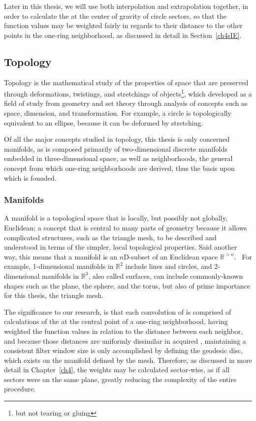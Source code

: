 Later in this thesis, we will use both interpolation and extrapolation together, in order to calculate the  at the center of gravity of circle sectors, so that the function values may be weighted fairly in regards to their distance to the other points in the one-ring neighborhood, as discussed in detail in Section~\ref{ch4sIE}.

%
%
%
%
\subsection{Topology}
\label{ch2sETBssT}
Topology is the mathematical study of the properties of space that are preserved through deformations, twistings, and stretchings of objects\footnote{but not tearing or gluing}, which developed as a field of study from geometry and set theory through analysis of concepts such as space, dimension, and transformation. For example, a circle is topologically equivalent to an ellipse, because it can be deformed by stretching.~\cite{Weisstein19c}

Of all the major concepts studied in topology, this thesis is only concerned manifolds, as \tdd{} is composed primarily of two-dimensional discrete manifolds embedded in three-dimensional space, as well as neighborhoods, the general concept from which one-ring neighborhoods are derived, thus the basis upon which  is founded.

%
%
\subsubsection{Manifolds}
\label{ch2sETBssTsssM}
A manifold is a topological space that is locally, but possibly not globally, Euclidean; a concept that is central to many parts of geometry because it allows complicated structures, such as the triangle mesh, to be described and understood in terms of the simpler, local topological properties. Said another way, this means that a manifold is an $n$D-subset of an Euclidean space $\mathbb{R}^{>n}$.~\cite[p.~199]{Mara12} For example, 1-dimensional manifolds in $\mathbb{R}^{2}$ include lines and circles, and 2-dimensional manifolds in $\mathbb{R}^{3}$, also called surfaces, can include commonly-known shapes such as the plane, the sphere, and the torus, but also of prime importance for this thesis, the triangle mesh.

The significance to our research, is that each convolution of  is comprised of calculations of the  at the central point of a one-ring neighborhood, having weighted the function values in relation to the distance between each neighbor, and because those distances are uniformly dissimilar in acquired \tdd{}, maintaining a consistent filter window size is only accomplished by defining the geodesic disc, which exists on the manifold defined by the mesh. Therefore, as discussed in more detail in Chapter~\ref{ch4}, the weights may be calculated sector-wise, as if all sectors were on the same plane, greatly reducing the complexity of the entire procedure.

